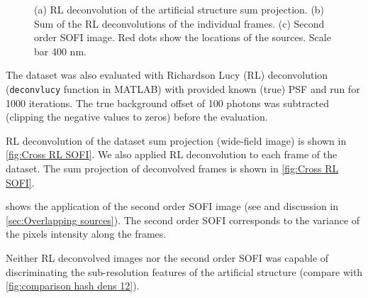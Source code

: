 \begin{figure}[!htb]
	\centering
	\newcommand{\wf}{.3\textwidth}
	\caption{(a) RL deconvolution of the artificial structure sum projection.  (b) Sum of the RL deconvolutions of the individual frames. (c) Second order SOFI image. Red dots show the locations of the sources. Scale bar 400 nm.}
	\label{fig:Cross RL SOFI}
\end{figure}
%
The dataset was also evaluated with Richardson \textendash{} Lucy (RL) deconvolution ({\tt de\-conv\-lucy} function in MATLAB) with provided known (true) PSF and run for 1000 iterations. The true background offset of 100 photons was subtracted (clipping the negative values to zeros) before the evaluation.

RL deconvolution of the dataset sum projection (wide-field image) is shown in \autoref{fig:Cross RL SOFI}\aaa. We also applied RL deconvolution to each frame of the dataset. The sum projection of deconvolved frames is shown in \autoref{fig:Cross RL SOFI}\bbb. 

\ccc{} shows the application of the second order SOFI image (see \cite{Dertinger2010b} and discussion in \autoref{sec:Overlapping sources}). The second order SOFI corresponds to the variance of the pixels intensity along the frames. 

Neither RL deconvolved images nor the second order SOFI was capable of discriminating the sub-resolution features of the artificial structure (compare with \autoref{fig:comparison hash dens 12}).


